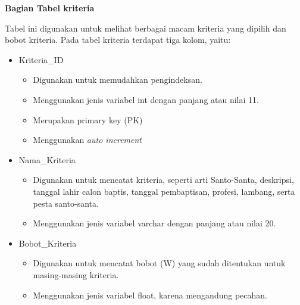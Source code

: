 \documentclass[a4paper,twoside]{article}
\begin{document}
\begin{enumerate}
\textbf{Bagian Tabel kriteria}

	Tabel ini digunakan untuk melihat berbagai macam kriteria yang dipilih dan bobot kriteria. Pada tabel kriteria terdapat tiga kolom, yaitu:

\begin{itemize}
	\item Kriteria\_ID 
	
	\begin{itemize}
		\item Digunakan untuk memudahkan pengindeksan.
		\item Menggunakan jenis variabel int dengan panjang atau nilai 11.
		\item Merupakan primary key (PK)
		
			
		\item Menggunakan \textit{auto increment}
		
	\end{itemize}
	
	\item Nama\_Kriteria 
	
	\begin{itemize}
		\item Digunakan untuk mencatat kriteria, seperti arti Santo-Santa, deskripsi, tanggal lahir calon baptis, tanggal pembaptisan, profesi, lambang, serta pesta santo-santa.
		\item Menggunakan jenis variabel varchar dengan panjang atau nilai 20.


	
	\end{itemize}
	\item Bobot\_Kriteria
	
	\begin{itemize}
		\item Digunakan untuk mencatat bobot (W) yang sudah ditentukan untuk masing-masing kriteria.
		\item Menggunakan jenis variabel float, karena mengandung pecahan.
		

\end{itemize}
\end{itemize}
\end{enumerate}
\end{document}

